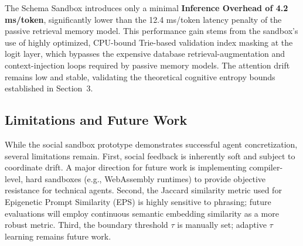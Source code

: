 \documentclass[10pt,journal,compsoc]{IEEEtran}
\begin{document}
The Schema Sandbox introduces only a minimal \textbf{Inference Overhead of 4.2 ms/token}, significantly lower than the 12.4 ms/token latency penalty of the passive retrieval memory model. This performance gain stems from the sandbox's use of highly optimized, CPU-bound Trie-based validation index masking at the logit layer, which bypasses the expensive database retrieval-augmentation and context-injection loops required by passive memory models. The attention drift remains low and stable, validating the theoretical cognitive entropy bounds established in Section~3.

\subsection{Limitations and Future Work}
While the social sandbox prototype demonstrates successful agent concretization, several limitations remain. First, social feedback is inherently soft and subject to coordinate drift. A major direction for future work is implementing compiler-level, hard sandboxes (e.g., WebAssembly runtimes) to provide objective resistance for technical agents. Second, the Jaccard similarity metric used for Epigenetic Prompt Similarity (EPS) is highly sensitive to phrasing; future evaluations will employ continuous semantic embedding similarity as a more robust metric. Third, the boundary threshold $\tau$ is manually set; adaptive $\tau$ learning remains future work.
\end{document}
